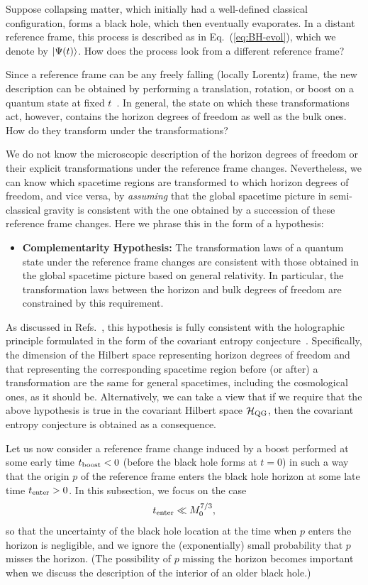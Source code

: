 \documentclass[12pt]{article}
\begin{document}
Suppose collapsing matter, which initially had a well-defined classical 
configuration, forms a black hole, which then eventually evaporates. 
In a distant reference frame, this process is described as in 
Eq.~(\ref{eq:BH-evol}), which we denote by $\left| \Psi(t) \right>$.  How 
does the process look from a different reference frame?

Since a reference frame can be any freely falling (locally Lorentz) frame, 
the new description can be obtained by performing a translation, rotation, 
or boost on a quantum state at fixed $t$~\cite{Nomura:2011rb}.  In general, 
the state on which these transformations act, however, contains the 
horizon degrees of freedom as well as the bulk ones.  How do they 
transform under the transformations?

We do not know the microscopic description of the horizon degrees of 
freedom or their explicit transformations under the reference frame 
changes.  Nevertheless, we can know which spacetime regions are transformed 
to which horizon degrees of freedom, and vice versa, by {\it assuming} 
that the global spacetime picture in semi-classical gravity is consistent 
with the one obtained by a succession of these reference frame changes. 
Here we phrase this in the form of a hypothesis:
%
\begin{itemize}
\item[] {\bf Complementarity Hypothesis:}
 The transformation laws of a quantum state under the reference frame 
 changes are consistent with those obtained in the global spacetime picture 
 based on general relativity.  In particular, the transformation laws 
 between the horizon and bulk degrees of freedom are constrained by this 
 requirement.
\end{itemize}
%
As discussed in Refs.~\cite{Nomura:2011rb,Nomura:2011dt}, this hypothesis 
is fully consistent with the holographic principle formulated in the form 
of the covariant entropy conjecture~\cite{Bousso:1999xy}.  Specifically, 
the dimension of the Hilbert space representing horizon degrees of freedom 
and that representing the corresponding spacetime region before (or 
after) a transformation are the same for general spacetimes, including 
the cosmological ones, as it should be.  Alternatively, we can take a 
view that if we require that the above hypothesis is true in the covariant 
Hilbert space ${\cal H}_{\rm QG}$, then the covariant entropy conjecture 
is obtained as a consequence.

Let us now consider a reference frame change induced by a boost performed 
at some early time $t_{\rm boost} < 0$ (before the black hole forms at 
$t=0$) in such a way that the origin $p$ of the reference frame enters 
the black hole horizon at some late time $t_{\rm enter} > 0$.  In this 
subsection, we focus on the case
%
\begin{equation}
  t_{\rm enter} \ll M_0^{7/3},
\label{eq:early-ent}
\end{equation}
%
so that the uncertainty of the black hole location at the time when $p$ 
enters the horizon is negligible, and we ignore the (exponentially) small 
probability that $p$ misses the horizon.  (The possibility of $p$ missing 
the horizon becomes important when we discuss the description of the 
interior of an older black hole.)
\end{document}
